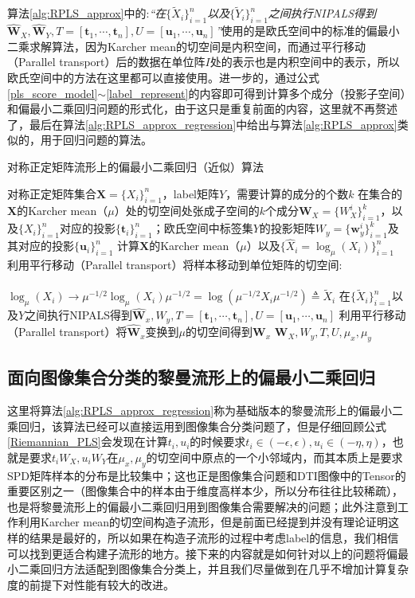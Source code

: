 算法\ref{alg:RPLS_approx}中的:\textit{“在$\{\tilde{X}_{i}\}_{i=1}^{n}$以及$\{\tilde{Y}_{i}\}_{i=1}^{n}$之间执行NIPALS\cite{pls_NIPALS}得到$\hat{\bm{W}}_X,\hat{\bm{W}}_Y,T=[\bm{t}_1,\cdots,\bm{t}_n],U=[\bm{u}_1,\cdots,\bm{u}_n]$”}使用的是欧氏空间中的标准的偏最小二乘求解算法，因为Karcher mean的切空间是内积空间，而通过平行移动（Parallel transport\cite{RCCA}）后的数据在单位阵$I$处的表示也是内积空间中的表示，所以欧氏空间中的方法在这里都可以直接使用。进一步的，通过公式\ref{pls_score_model}$\sim$\ref{label_represent}的内容即可得到计算多个成分（投影子空间）和偏最小二乘回归问题的形式化，由于这只是重复前面的内容，这里就不再赘述了，最后在算法\ref{alg:RPLS_approx_regression}中给出与算法\ref{alg:RPLS_approx}类似的，用于回归问题的算法。
\begin{algorithm}[hbt]
\caption{对称正定矩阵流形上的偏最小二乘回归（近似）算法}
\label{alg:RPLS_approx_regression}
\begin{algorithmic}[1]
\REQUIRE 对称正定矩阵集合$\bm{X}=\{X_i\}_{i=1}^{n}$，label矩阵$Y$，需要计算的成分的个数$k$
\ENSURE 在集合的$\bm{X}$的Karcher mean（$\mu$）处的切空间处张成子空间的$k$个成分$\bm{W}_{X}=\{W_{X}^{i}\}_{i=1}^{k}$，以及$\{X_i\}_{i=1}^{n}$对应的投影$\{\bm{t}_i\}_{i=1}^{n}$；欧氏空间中标签集$Y$的投影矩阵$W_y=\{\bm{w}_{y}^{i}\}_{i=1}^{k}$及其对应的投影$\{\bm{u}_i\}_{i=1}^{n}$
\STATE 计算$\bm{X}$的Karcher mean（$\mu$）以及$\{\hat{X}_i=\log_{\mu}(X_i)\}_{i=1}^{n}$
\STATE 利用平行移动（Parallel transport\cite{RCCA}）将样本移动到单位矩阵的切空间:\\
 ~~~~~~~~~~~~~~~~~~~~$\log_{\mu}(X_i)\rightarrow \mu^{-1/2}\log_{\mu}(X_i)\mu^{-1/2}=\log(\mu^{-1/2}X_i\mu^{-1/2})\triangleq \tilde{X}_i$
\STATE 在$\{\tilde{X}_{i}\}_{i=1}^{n}$以及$Y$之间执行NIPALS\cite{pls_NIPALS}得到$\hat{\bm{W}}_x,W_y,T=[\bm{t}_1,\cdots,\bm{t}_n],U=[\bm{u}_1,\cdots,\bm{u}_n]$
\STATE 利用平行移动（Parallel transport\cite{RCCA}）将$\hat{\bm{W}}_x$变换到$\mu$的切空间得到$\bm{W}_x$
\RETURN $\bm{W}_X,W_y,T,U,\mu_x,\mu_y$
\end{algorithmic}
\end{algorithm}
\subsection{面向图像集合分类的黎曼流形上的偏最小二乘回归}
\label{sec:ImageSet_PLS}
这里将算法\ref{alg:RPLS_approx_regression}称为基础版本的黎曼流形上的偏最小二乘回归，该算法已经可以直接运用到图像集合分类问题了，但是仔细回顾公式\ref{Riemannian_PLS}会发现在计算$t_i,u_i$的时候要求$t_i \in (-\epsilon,\epsilon),u_i \in (-\eta,\eta)$，也就是要求$t_iW_X,u_iW_Y$在$\mu_x,\mu_y$的切空间中原点的一个小邻域内，而其本质上是要求SPD矩阵样本的分布是比较集中；这也正是图像集合问题和DTI图像中的Tensor的重要区别之一（图像集合中的样本由于维度高样本少，所以分布往往比较稀疏），也是将黎曼流形上的偏最小二乘回归用到图像集合需要解决的问题；此外注意到工作\cite{RCCA,PGA}利用Karcher mean的切空间构造子流形，但是前面已经提到并没有理论证明这样的结果是最好的，所以如果在构造子流形的过程中考虑label的信息，我们相信可以找到更适合构建子流形的地方。接下来的内容就是如何针对以上的问题将偏最小二乘回归方法适配到图像集合分类上，并且我们尽量做到在几乎不增加计算复杂度的前提下对性能有较大的改进。
